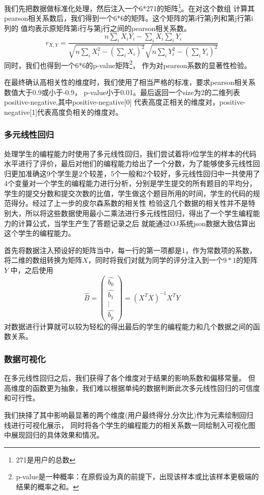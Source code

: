 \documentclass[UTF8]{ctexart}
\begin{document}
我们先把数据做标准化处理，然后注入一个6*271的矩阵\footnote{271是用户的总数}。在对这个数组
计算其pearson相关系数后，我们得到一个6*6的矩阵。这个矩阵的第i行第j列和第j行第i列的
值均表示原矩阵第i行与第j行之间的pearson相关系数。$$ r_{X,Y}=\dfrac{n\sum_{i} X_iY_i-\sum_{i} X_i \sum_{i} Y_i}{\sqrt{n\sum_{i} X_i^2-(\sum_{i} X_i)^2}\sqrt{n\sum_{i} Y_i^2-(\sum_{i} Y_i)^2}} $$
同时，我们也得到一个6*6的p-value矩阵\footnote{p-value是一种概率：在原假设为真的前提下，出现该样本或比该样本更极端的结果的概率之和。}，
作为对pearson系数的显著性检验。

在最终确认高相关性的维度时，我们使用了相当严格的标准，要求pearson相关系数值大于0.9或小于-0.9，
p-value小于0.01。最后返回一个size为2的二维列表positive-negative,其中positive-negative[0]
代表高度正相关的维度对，positive-negative[1]代表高度负相关的维度对。
\subsubsection{多元线性回归}
处理学生的编程能力时使用了多元线性回归，我们尝试着将9位学生的样本的代码水平进行了评价，最后对他们的编程能力给出了一个分数，为了能够使多元线性回
归更加准确这9个学生是2个较差，5个一般和2个较好，多元线性回归中一共使用了4个变量对一个学生的编程能力进行分析，分别是学生提交的所有题目的平均分，
学生的提交分数和提交次数的比值，学生做这个题目所用的时间，学生的代码的规范得分。经过了上一步的皮尔森系数的相关性
检验这几个数据的相关性并不是特别大，所以将这些数据使用最小二乘法进行多元线性回归，得出了一个学生编程能力的计算公式，当学生产生了答题记录之后
就能通过OJ系统json数据大致估算出这个学生的编程能力。

首先将数据注入预设好的矩阵当中，每一行的第一项都是1，作为常数项的系数，将二维的数组转换为矩阵$X$，同时将我们对就为同学的评分注入到一个$9*1$的矩阵$Y$
中，之后使用\boldmath$$\hat{B}=\begin{pmatrix}
    \hat{b_0}\\\hat{b_1}\\\vdots\\\hat{b_p}
\end{pmatrix}=(X^TX)^{-1}X^TY$$\unboldmath
对数据进行计算就可以较为轻松的得出最后的学生的编程能力和几个数据之间的函数关系。
\subsubsection{数据可视化}
在多元线性回归之后，我们获得了各个维度对于结果的影响系数和偏移常量。
但高维度的函数更为抽象，我们难以根据单纯的数据判断此次多元线性回归的可信度和可行性。

我们抉择了其中影响最显著的两个维度(用户最终得分,分次比)作为元素绘制回归线进行可视化展示，
同时将各个学生的编程能力的相关系数一同绘制入可视化图中展现回归的具体效果和情况。
\end{document}
